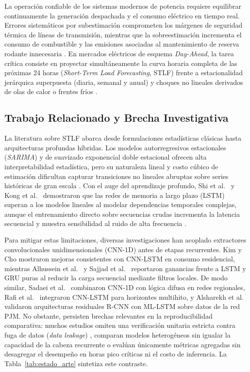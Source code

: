\documentclass[conference]{IEEEtran}
\begin{document}
La operación confiable de los sistemas modernos de potencia requiere equilibrar continuamente la generación despachada y el consumo eléctrico en tiempo real. Errores sistemáticos por subestimación comprometen los márgenes de seguridad térmica de líneas de transmisión, mientras que la sobreestimación incrementa el consumo de combustible y las emisiones asociadas al mantenimiento de reserva rodante innecesaria \cite{hippert2001neural,taylor2003short}. En mercados eléctricos de esquema \textit{Day-Ahead}, la tarea crítica consiste en proyectar simultáneamente la curva horaria completa de las próximas 24 horas (\textit{Short-Term Load Forecasting}, STLF) frente a estacionalidad jerárquica superpuesta (diaria, semanal y anual) y choques no lineales derivados de olas de calor o frentes fríos \cite{lim2021time,ahajjam2022experimental}.

\subsection{Trabajo Relacionado y Brecha Investigativa}
La literatura sobre STLF abarca desde formulaciones estadísticas clásicas hasta arquitecturas profundas híbridas. Los modelos autorregresivos estacionales (\textit{SARIMA}) y de suavizado exponencial doble estacional \cite{taylor2003short} ofrecen alta interpretabilidad estadística, pero su naturaleza lineal y costo cúbico de estimación dificultan capturar transiciones no lineales abruptas sobre series históricas de gran escala \cite{hippert2001neural}. Con el auge del aprendizaje profundo, Shi et al.\ \cite{shi2018deep} y Kong et al.\ \cite{kong2019short} demostraron que las redes de memoria a largo plazo (LSTM) \cite{hochreiter1997long} superan a los modelos lineales al modelar dependencias temporales complejas, aunque el entrenamiento directo sobre secuencias crudas incrementa la latencia secuencial y muestra sensibilidad al ruido de alta frecuencia \cite{ageng2021short}.

Para mitigar estas limitaciones, diversas investigaciones han acoplado extractores convolucionales unidimensionales (CNN-1D) antes de etapas recurrentes. Kim y Cho \cite{kim2019predicting} mostraron mejoras consistentes con CNN-LSTM en consumo residencial, mientras Alhussein et al.\ \cite{alhussein2020hybrid} y Sajjad et al.\ \cite{sajjad2020novel} reportaron ganancias frente a LSTM y GRU puras al reducir la carga secuencial mediante filtros locales. De modo similar, Sadaei et al.\ \cite{sadaei2019short} combinaron CNN-1D con lógica difusa en redes regionales, Rafi et al.\ \cite{rafi2021short} integraron CNN-LSTM para horizontes multihito, y Alsharekh et al.\ \cite{alsharekh2022improving} validaron arquitecturas residuales R-CNN con ML-LSTM sobre datos de la red PJM. No obstante, persisten brechas relevantes en la reproducibilidad comparativa: muchos estudios omiten una verificación unitaria estricta contra fuga de datos (\textit{data leakage}) \cite{lim2021time}, comparan modelos heterogéneos sin igualar la capacidad de la cabeza recurrente o evalúan únicamente métricas agregadas sin desagregar el desempeño en horas pico críticas ni el costo de inferencia. La Tabla~\ref{tab:estado_arte} sintetiza este contraste.
\end{document}
